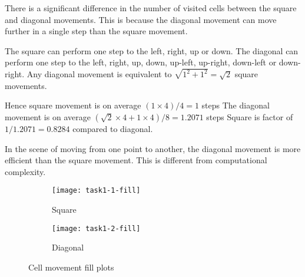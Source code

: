 There is a significant difference in the number of visited cells between the square and diagonal movements.
This is because the diagonal movement can move further in a single step than the square movement.

The square can perform one step to the left, right, up or down.
The diagonal can perform one step to the left, right, up, down, up-left, up-right, down-left or down-right.
Any diagonal movement is equivalent to $\sqrt{1^2 + 1^2} = \sqrt{2}$ square movements.

Hence square movement is on average $(1 \times 4) / 4 = 1$ steps
The diagonal movement is on average $(\sqrt{2} \times 4 + 1 \times 4) / 8 = 1.2071$ steps
Square is factor of $1 / 1.2071 = 0.8284$ compared to diagonal.

In the scene of moving from one point to another, the diagonal movement is more efficient than the square movement.
This is different from computational complexity.



\clearpage

\begin{figure}[ht]
    \centering
    \begin{subfigure}{\textwidth}
        \centering
        \texttt{[image: task1-1-fill]}
        \caption[Square]{Square}
        \label{fig:task1-1-fill}
    \end{subfigure}
    \begin{subfigure}{\textwidth}
        \centering
        \texttt{[image: task1-2-fill]}
        \caption[Diagonal]{Diagonal}
        \label{fig:task1-2-fill}
    \end{subfigure}
    \caption[Cell movement fill plots]{Cell movement fill plots}
    \label{fig:task1-fill}
\end{figure}

\clearpage

